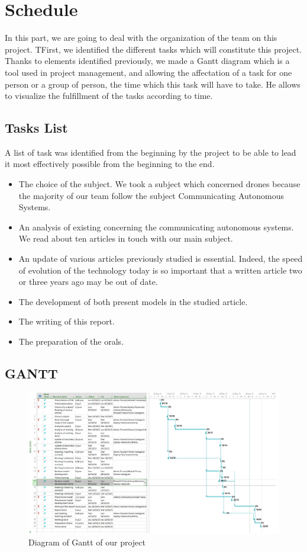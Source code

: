 \chapter{Schedule}

In this part, we are going to deal with the organization of the team on this project. TFirst, we identified the different tasks which will constitute this project. Thanks to elements identified previously, we made a Gantt diagram which is a tool used in project management, and allowing the affectation of a task for one person or a group of person, the time which this task will have to take. He allows to visualize the fulfillment of the tasks according to time.

\section{Tasks List}

A list of task was identified from the beginning by the project to be able to lead it most effectively possible from the beginning to the end.

\begin{itemize}
\item The choice of the subject. We took a subject which concerned drones because the majority of our team follow the subject Communicating Autonomous Systems.
\item An analysis of existing concerning the communicating autonomous systems. We read about ten articles in touch with our main subject.
\item An update of various articles previously studied is essential. Indeed, the speed of evolution of the technology today is so important that a written article two or three years ago may be out of date.
\item The development of both present models in the studied article.
\item The writing of this report.
\item The preparation of the orals.
\end{itemize}

\newpage

\section{GANTT}

\begin{figure}[h]
\center
\includegraphics[scale=0.7]{../images/Gantt.png}
\caption{\label{Gantt}Diagram of Gantt of our project}
\end{figure}